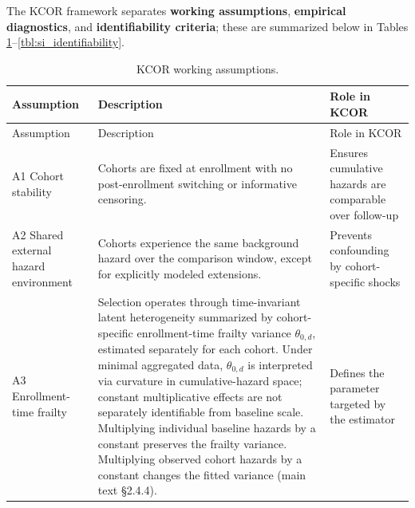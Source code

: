 \documentclass[
]{article}
\begin{document}
The KCOR framework separates \textbf{working assumptions}, \textbf{empirical diagnostics}, and \textbf{identifiability criteria}; these are summarized below in Tables \ref{tbl:si_assumptions}--\ref{tbl:si_identifiability}.

\begin{longtable}[]{@{}
  >{\raggedright\arraybackslash}p{}
  >{\raggedright\arraybackslash}p{}
  >{\raggedright\arraybackslash}p{}@{}}
\caption{KCOR working assumptions.}\label{tbl:si_assumptions}\tabularnewline
\toprule\noalign{}
\begin{minipage}[b]{\linewidth}\raggedright
Assumption
\end{minipage} & \begin{minipage}[b]{\linewidth}\raggedright
Description
\end{minipage} & \begin{minipage}[b]{\linewidth}\raggedright
Role in KCOR
\end{minipage} \\
\midrule\noalign{}
\endfirsthead
\toprule\noalign{}
\begin{minipage}[b]{\linewidth}\raggedright
Assumption
\end{minipage} & \begin{minipage}[b]{\linewidth}\raggedright
Description
\end{minipage} & \begin{minipage}[b]{\linewidth}\raggedright
Role in KCOR
\end{minipage} \\
\midrule\noalign{}
\endhead
\bottomrule\noalign{}
\endlastfoot
A1 Cohort stability & Cohorts are fixed at enrollment with no post-enrollment switching or informative censoring. & Ensures cumulative hazards are comparable over follow-up \\
A2 Shared external hazard environment & Cohorts experience the same background hazard over the comparison window, except for explicitly modeled extensions. & Prevents confounding by cohort-specific shocks \\
A3 Enrollment-time frailty & Selection operates through time-invariant latent heterogeneity summarized by cohort-specific enrollment-time frailty variance \(\theta_{0,d}\), estimated separately for each cohort. Under minimal aggregated data, \(\theta_{0,d}\) is interpreted via curvature in cumulative-hazard space; constant multiplicative effects are not separately identifiable from baseline scale. Multiplying individual baseline hazards by a constant preserves the frailty variance. Multiplying observed cohort hazards by a constant changes the fitted variance (main text §2.4.4). & Defines the parameter targeted by the estimator \\

\end{longtable}
\end{document}
